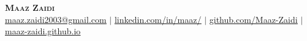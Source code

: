 \begin{center}
	\textbf{\Huge \scshape Maaz Zaidi} \\ \vspace{5pt}
    \href{maaz.zaidi2003@gmail.com}{\underline{maaz.zaidi2003@gmail.com}} $|$
	\href{https://www.linkedin.com/in/maaz-zaidi-5a08721b4/}{\underline{linkedin.com/in/maaz/}} $|$
	\href{https://github.com/Maaz-Zaidi}{\underline{github.com/Maaz-Zaidi}} $|$
    \href{https://maaz-zaidi.github.io}{\underline{maaz-zaidi.github.io}} 
\end{center}
